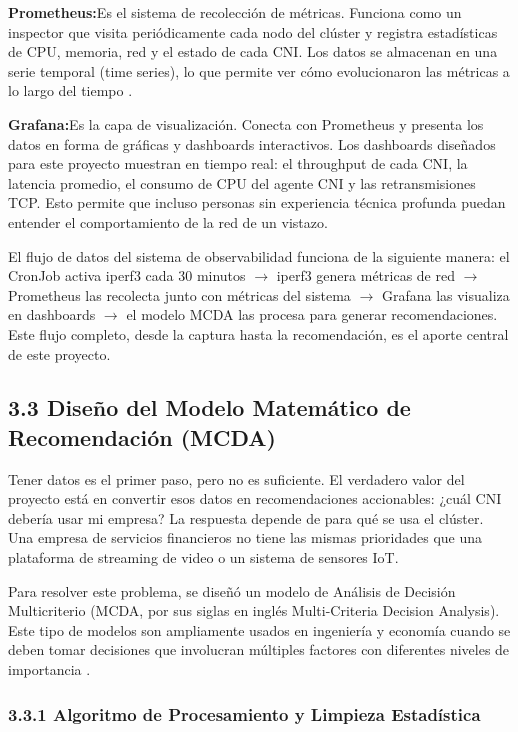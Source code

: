 \documentclass[journal]{IEEEtran}
\begin{document}
\textbf{Prometheus:}Es el sistema de recolección de métricas. Funciona como un inspector que visita periódicamente cada nodo del clúster y registra estadísticas de CPU, memoria, red y el estado de cada CNI. Los datos se almacenan en una serie temporal (time series), lo que permite ver cómo evolucionaron las métricas a lo largo del tiempo \cite{ref6}.

\textbf{Grafana:}Es la capa de visualización. Conecta con Prometheus y presenta los datos en forma de gráficas y dashboards interactivos. Los dashboards diseñados para este proyecto muestran en tiempo real: el throughput de cada CNI, la latencia promedio, el consumo de CPU del agente CNI y las retransmisiones TCP. Esto permite que incluso personas sin experiencia técnica profunda puedan entender el comportamiento de la red de un vistazo.

El flujo de datos del sistema de observabilidad funciona de la siguiente manera: el CronJob activa iperf3 cada 30 minutos $\rightarrow$ iperf3 genera métricas de red $\rightarrow$ Prometheus las recolecta junto con métricas del sistema $\rightarrow$ Grafana las visualiza en dashboards $\rightarrow$ el modelo MCDA las procesa para generar recomendaciones. Este flujo completo, desde la captura hasta la recomendación, es el aporte central de este proyecto.

\subsection{3.3 Diseño del Modelo Matemático de Recomendación (MCDA)}

Tener datos es el primer paso, pero no es suficiente. El verdadero valor del proyecto está en convertir esos datos en recomendaciones accionables: ¿cuál CNI debería usar mi empresa? La respuesta depende de para qué se usa el clúster. Una empresa de servicios financieros no tiene las mismas prioridades que una plataforma de streaming de video o un sistema de sensores IoT.

Para resolver este problema, se diseñó un modelo de Análisis de Decisión Multicriterio (MCDA, por sus siglas en inglés Multi-Criteria Decision Analysis). Este tipo de modelos son ampliamente usados en ingeniería y economía cuando se deben tomar decisiones que involucran múltiples factores con diferentes niveles de importancia \cite{ref9}.

\subsubsection{3.3.1 Algoritmo de Procesamiento y Limpieza Estadística}
\end{document}
